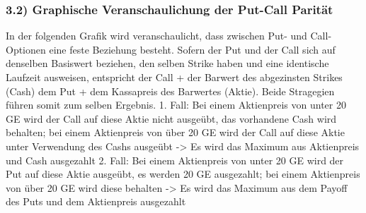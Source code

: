 \documentclass[paper=landscape]{scrartcl}
\begin{document}
    \hypertarget{graphische-veranschaulichung-der-put-call-parituxe4t}{%
\subsubsection{3.2) Graphische Veranschaulichung der Put-Call
Parität}\label{graphische-veranschaulichung-der-put-call-parituxe4t}}

In der folgenden Grafik wird veranschaulicht, dass zwischen Put- und
Call-Optionen eine feste Beziehung besteht. Sofern der Put und der Call
sich auf denselben Basiswert beziehen, den selben Strike haben und eine
identische Laufzeit ausweisen, entspricht der Call + der Barwert des
abgezinsten Strikes (Cash) dem Put + dem Kassapreis des Barwertes
(Aktie). Beide Stragegien führen somit zum selben Ergebnis. 1. Fall: Bei
einem Aktienpreis von unter 20 GE wird der Call auf diese Aktie nicht
ausgeübt, das vorhandene Cash wird behalten; bei einem Aktienpreis von
über 20 GE wird der Call auf diese Aktie unter Verwendung des Cashs
ausgeübt -\textgreater{} Es wird das Maximum aus Aktienpreis und Cash
ausgezahlt 2. Fall: Bei einem Aktienpreis von unter 20 GE wird der Put
auf diese Aktie ausgeübt, es werden 20 GE ausgezahlt; bei einem
Aktienpreis von über 20 GE wird diese behalten -\textgreater{} Es wird
das Maximum aus dem Payoff des Puts und dem Aktienpreis ausgezahlt
\end{document}
